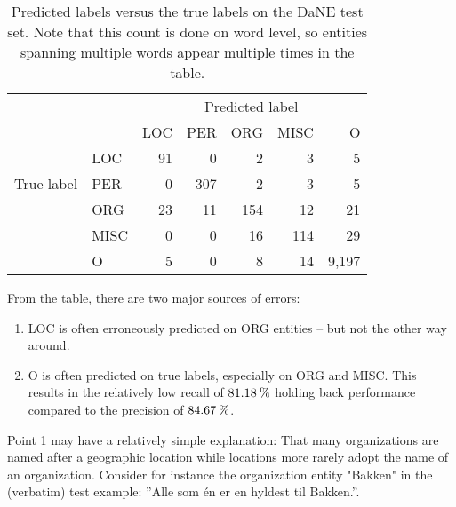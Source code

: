 \documentclass[main.tex]{subfiles}
\begin{document}
\begin{table}[H]
    \centering
    \small
    \begin{tabular}{l l | r r r r r }
        & &	\multicolumn{5}{c}{Predicted label}	\\
        \multirow{5}{*}{True label} & & LOC & PER & ORG & MISC & O \\\hline
            & LOC  & 91 & 0    & 2   & 3   & 5   \\
            & PER  & 0  & 307  & 2   & 3   & 5   \\
            & ORG  & 23 & 11   & 154 & 12  & 21  \\
            & MISC & 0  & 0    & 16  & 114 & 29  \\
            & O    & 5  & 0    & 8   & 14  & 9,197
    \end{tabular}
    \caption{
        Predicted labels versus the true labels on the DaNE test set.
        Note that this count is done on word level, so entities spanning multiple words appear multiple times in the table.
    }
    \label{tab:pred-true-confmat}
\end{table}\noindent
From the table, there are two major sources of errors:
\begin{enumerate}
    \item LOC is often erroneously predicted on ORG entities -- but not the other way around.
    \item O is often predicted on true labels, especially on ORG and MISC. This results in the relatively low recall of $81.18\:\text{\%{}}$ holding back performance compared to the precision of $84.67\:\text{\%{}}$.
\end{enumerate}
Point 1 may have a relatively simple explanation: 
That many organizations are named after a geographic location while locations more rarely adopt the name of an organization.
Consider for instance the organization entity "Bakken" in the (verbatim) test example: ''Alle som én er en hyldest til Bakken.''.
\end{document}
